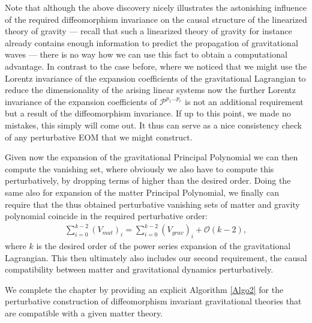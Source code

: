 \documentclass[a4paper,12pt, DIV=14, BCOR=5mm, twoside, headsepline, numbers=noenddot]{scrbook}
\begin{document}
Note that although the above discovery nicely illustrates the astonishing influence of the required diffeomorphism invariance on the causal structure of the linearized theory of gravity --- recall that such a linearized theory of gravity for instance already contains enough information to predict the propagation of gravitational waves --- there is no way how we can use this fact to obtain a computational advantage. In contrast to the case before, where we noticed that we might use the Lorentz invariance of the expansion coefficients of the gravitational Lagrangian to reduce the dimensionality of the arising linear systems now the further Lorentz invariance of the expansion coefficients of $\mathcal{P}^{p_1...p_r}$ is not an additional requirement but a result of the diffeomorphism invariance. If up to this point, we made no mistakes, this simply will come out. It thus can serve as a nice consistency check of any perturbative EOM that we might construct.

Given now the expansion of the gravitational Principal Polynomial we can then compute the vanishing set, where obviously we also have to compute this perturbatively, by dropping terms of higher than the desired order. Doing the same also for expansion of the matter Principal Polynomial, we finally can require that the thus obtained perturbative vanishing sets of matter and gravity polynomial coincide in the required perturbative order: 
\begin{align}
    \sum_{i=0}^{k-2} (V_{mat})_i = \sum _{i=0}^{k-2}(V_{grav})_i + \mathcal{O}(k-2),
\end{align}
where $k$ is the desired order of the power series expansion of the gravitational Lagrangian. This then ultimately also includes our second requirement, the causal compatibility between matter and gravitational dynamics perturbatively. 

We complete the chapter by providing an explicit Algorithm \ref{Algo2} for the perturbative construction of diffeomorphism invariant gravitational theories that are compatible with a given matter theory.
\end{document}
